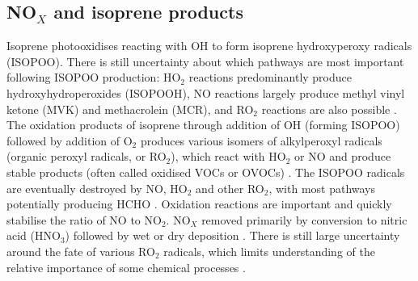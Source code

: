   \subsection{NO$_X$ and isoprene products}
    \label{Ch_LitRev:sec:IsopNox}
    Isoprene photooxidises reacting with OH to form isoprene hydroxyperoxy radicals (ISOPOO).
    There is still uncertainty about which pathways are most important following ISOPOO production: HO$_2$ reactions predominantly produce hydroxyhydroperoxides (ISOPOOH), NO reactions largely produce methyl vinyl ketone (MVK) and methacrolein (MCR), and RO$_2$ reactions are also possible \cite{Liu2016a}.
    The oxidation products of isoprene through addition of OH (forming ISOPOO) followed by addition of O$_2$ produces various isomers of alkylperoxyl radicals (organic peroxyl radicals, or RO$_2$), which react with HO$_2$ or NO and produce stable products (often called oxidised VOCs or OVOCs) \citep{Nguyen2014}.
    The ISOPOO radicals are eventually destroyed by NO, HO$_2$ and other RO$_2$, with most pathways potentially producing HCHO \citep{Wolfe2016}.
    Oxidation reactions are important and quickly stabilise the ratio of NO to NO$_2$. 
    NO$_X$ removed primarily by conversion to nitric acid (HNO$_3$) followed by wet or dry deposition \citep{Ayers2006}.
    There is still large uncertainty around the fate of various RO$_2$ radicals, which limits understanding of the relative importance of some chemical processes \citep{Crounse2013}.
    

